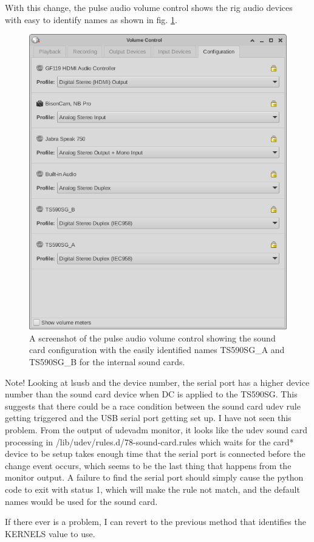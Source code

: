 \documentclass[12pt]{article}
\begin{document}
With this change, the pulse audio volume control shows the rig audio
devices with easy to identify names as shown in fig. \ref{f1}.
\begin{figure}
\begin{center}
\includegraphics[width=.9\textwidth]{pulse_volume.png}
\end{center}
\caption{A screenshot of the pulse audio volume control showing the
sound card configuration with the easily identified
names TS590SG\_A and TS590SG\_B for the internal sound cards.}
\label{f1}
\end{figure}

Note! Looking at lsusb and the device number, the serial port has a
higher device number than the sound card device when DC is applied
to the TS590SG. This suggests that there could be a race condition
between the sound card udev rule getting triggered and the USB serial
port getting set up. I have not seen this problem. From the output
of udevadm monitor, it looks like the udev sound card processing in
/lib/udev/rules.d/78-sound-card.rules which waits for the card* device
to be setup takes enough time that the serial port is connected before
the change event occurs, which seems to be the last thing that happens
from the monitor output.  A failure to find the serial port should simply
cause the python code to exit with status 1, which will make the rule
not match, and the default names would be used for the sound card.

If there ever is a problem, I can revert to the previous method that
identifies the KERNELS value to use.
\end{document}

